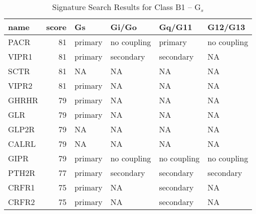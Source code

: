 \begin{table}[!h]

\caption{\label{tab:}Signature Search Results for Class B1 – G$_{s}$}
\centering
\begin{tabular}{lrllll}
\toprule
name & score & Gs & Gi/Go & Gq/G11 & G12/G13\\
\midrule
PACR & 81 & primary & no coupling & primary & no coupling\\
VIPR1 & 81 & primary & secondary & secondary & NA\\
SCTR & 81 & NA & NA & NA & NA\\
VIPR2 & 81 & primary & NA & NA & NA\\
GHRHR & 79 & primary & NA & NA & NA\\
GLR & 79 & primary & NA & NA & NA\\
GLP2R & 79 & NA & NA & NA & NA\\
CALRL & 79 & NA & NA & NA & NA\\
GIPR & 79 & primary & no coupling & no coupling & no coupling\\
PTH2R & 77 & primary & secondary & secondary & secondary\\
CRFR1 & 75 & primary & NA & secondary & NA\\
CRFR2 & 75 & primary & NA & secondary & NA\\
\bottomrule
\end{tabular}
\end{table}
